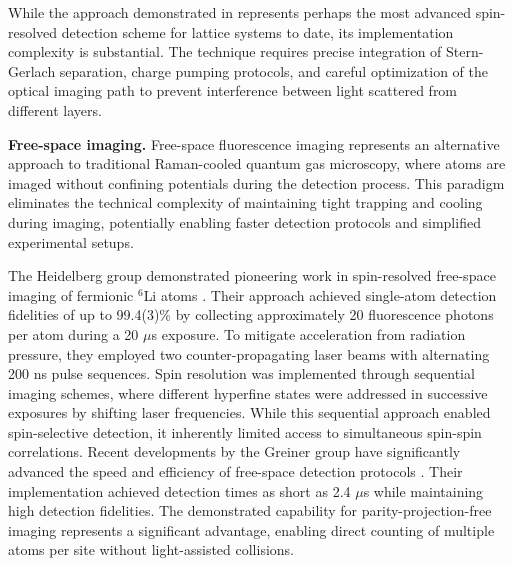 While the approach demonstrated in \cite{koepsell_robust_2020} represents perhaps the most advanced spin-resolved detection scheme for lattice systems to date, its implementation complexity is substantial. The technique requires precise integration of Stern-Gerlach separation, charge pumping protocols, and careful optimization of the optical imaging path to prevent interference between light scattered from different layers. 





\textbf{Free-space imaging.} Free-space fluorescence imaging represents an alternative approach to traditional Raman-cooled quantum gas microscopy, where atoms are imaged without confining potentials during the detection process. This paradigm eliminates the technical complexity of maintaining tight trapping and cooling during imaging, potentially enabling faster detection protocols and simplified experimental setups.

The Heidelberg group demonstrated pioneering work in spin-resolved free-space imaging of fermionic $^6$Li atoms \cite{bergschneider_spin-resolved_2018}. Their approach achieved single-atom detection fidelities of up to 99.4(3)\% by collecting approximately 20 fluorescence photons per atom during a 20 $\mu$s exposure. To mitigate acceleration from radiation pressure, they employed two counter-propagating laser beams with alternating 200 ns pulse sequences. Spin resolution was implemented through sequential imaging schemes, where different hyperfine states were addressed in successive exposures by shifting laser frequencies. While this sequential approach enabled spin-selective detection, it inherently limited access to simultaneous spin-spin correlations. Recent developments by the Greiner group have significantly advanced the speed and efficiency of free-space detection protocols \cite{su_fast_2025}. Their implementation achieved detection times as short as 2.4 $\mu$s while maintaining high detection fidelities. The demonstrated capability for parity-projection-free imaging represents a significant advantage, enabling direct counting of multiple atoms per site without light-assisted collisions.

